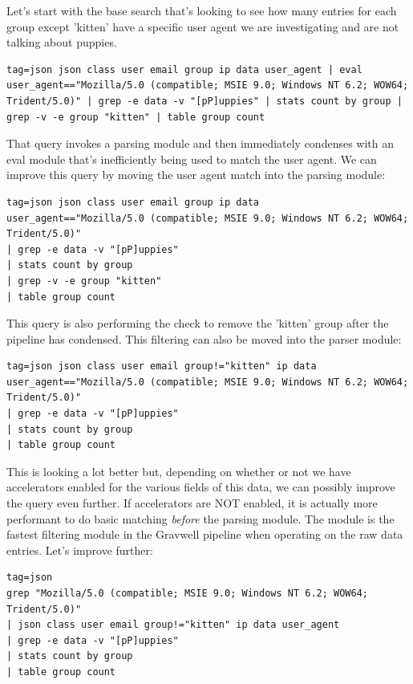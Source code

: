 Let's start with the base search that's looking to see how many entries
for each group except 'kitten' have a specific user agent we are
investigating and are not talking about puppies.

\begin{Verbatim}[breaklines=true]
tag=json json class user email group ip data user_agent | eval user_agent=="Mozilla/5.0 (compatible; MSIE 9.0; Windows NT 6.2; WOW64; Trident/5.0)" | grep -e data -v "[pP]uppies" | stats count by group | grep -v -e group "kitten" | table group count
\end{Verbatim}

That query invokes a parsing module and then immediately condenses with
an eval module that's inefficiently being used to match the user agent.
We can improve this query by moving the user agent match into the
parsing module:

\begin{Verbatim}[breaklines=true]
tag=json json class user email group ip data 
user_agent=="Mozilla/5.0 (compatible; MSIE 9.0; Windows NT 6.2; WOW64; Trident/5.0)"
| grep -e data -v "[pP]uppies" 
| stats count by group 
| grep -v -e group "kitten" 
| table group count
\end{Verbatim}

This query is also performing the check to remove the 'kitten' group
after the pipeline has condensed. This filtering can also be moved into
the parser module:

\begin{Verbatim}[breaklines=true]
tag=json json class user email group!="kitten" ip data 
user_agent=="Mozilla/5.0 (compatible; MSIE 9.0; Windows NT 6.2; WOW64; Trident/5.0)"
| grep -e data -v "[pP]uppies" 
| stats count by group 
| table group count
\end{Verbatim}

This is looking a lot better but, depending on whether or not we have
accelerators enabled for the various fields of this data, we can
possibly improve the query even further. If accelerators are NOT
enabled, it is actually more performant to do basic matching \emph{before} the
parsing module. The  module is the fastest filtering module in the
Gravwell pipeline when operating on the raw data entries. Let's improve
further:

\begin{Verbatim}[breaklines=true]
tag=json 
grep "Mozilla/5.0 (compatible; MSIE 9.0; Windows NT 6.2; WOW64; Trident/5.0)"
| json class user email group!="kitten" ip data user_agent 
| grep -e data -v "[pP]uppies" 
| stats count by group 
| table group count
\end{Verbatim}

